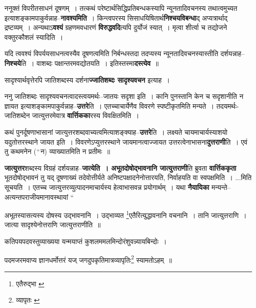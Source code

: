 \documentclass[article,12pt,a4paper]{memoir}
\newcommand{\add}[1]{($^{+}$#1)}
\begin{document}
	  \endgroup
	

	  \pstart ननूक्तं विपरीतसाधनं दूषणम् । तत्कथं परेष्टार्थसिद्धिप्रतिबन्धकस्यापि न्यूनतादिवचनस्य तथात्वमुच्यत इत्याशङ्कामपाकुर्वन्नाह--\textbf{नावश्यमिति} । किन्त्वपरस्य सिसाधयिषितार्थ\textbf{निश्चयविबन्धा}द् अप्यत्रार्थाद् द्रष्टव्यम् । अन्यथाऽ\textbf{वश्यं} ग्रहणमवधारणं \textbf{विरुद्धवदि}त्यपि दुर्योजं स्यात् । मृत्वा शीर्त्वा च तद्योजने वक्तुरकौशलं स्यादिति ।
	\pend
      

	  \pstart यदि त्ववश्यं विपर्ययसाधनत्वस्यैव दूषणत्वमिति निर्बन्धस्तदा तदप्यस्य न्यूनतादिवचनस्यास्तीति दर्शयन्नाह--\textbf{निश्चये}ति । वाशब्दः पक्षान्तरमवद्योतयति । इतिस्तस्मा\textbf{दस्त्येव} ॥
	\pend
      

	  \pstart सादृश्यार्थवृत्तेरपि जातिशब्दस्य दर्शना\textbf{ज्जातिशब्दः सादृश्यवचन} इत्याह ।
	\pend
      

	  \pstart ननु जातिशब्दः सादृश्यवचनत्वादस्त्वयमर्थः--जातयः सदृशा इति । कानि पुनस्तानि केन च सदृशानीति न ज्ञायत इत्याशङ्कामपाकुर्वन्नाह--\textbf{उत्तरे}ति । एतच्चाचार्येणैव विवरणे स्पष्टीकृतमिति मन्यते । तदयमर्थः-जातिशब्देन जात्युत्तरमेवात्र \textbf{वार्त्तिकका}रस्य विवक्षितमिति ।
	\pend
      

	  \pstart कथं पुनर्दूषणाभासानां जात्युत्तरशब्दवाच्यत्वमित्याशङ्क्याह--\textbf{उत्तरे}ति । लक्ष्यते चायमाचार्यस्याशयो यदुतोत्तरस्थाने जायत इति । विवरणेऽप्युत्तरस्थाने जायमानत्वाज्जायत उत्तरत्वेनाभासना\textbf{दुत्तराणी}ति । एवं तु कथमनेन \add{न} व्याख्यातमिति न प्रतीमः ॥
	\pend
      

	  \pstart \textbf{जात्युत्तर}शब्दस्य विग्रहं दर्शयन्नाह--\textbf{जात्येति । अभूतदोषोद्भावनानि जात्युत्तराणी}ति ब्रुवता \textbf{वार्त्तिककृता} भूतदोषोद्भावनं तु यद् दूषणाख्यं तदेवोत्तीर्यते अनिष्टपक्षादनेनोत्तारयति, निर्वाहयति वा स्वपक्षमिति । \leavevmode{}...मिति सूचयति । एतच्च जात्युत्तरव्युत्पादनमाचार्यस्य हेत्वाभासवन्न प्रयोगार्थम् । यथा \textbf{नैयायिका} मन्यन्ते--अत्यन्तपराजीयमानावस्थायां     \leavevmode{} “
	  
	अभूतस्यासत्यस्य दोषस्य उद्भावनानि । उद्भाव्यत \footnote{एतैरुद्भा \cite{dp-msC}}\-एतैरित्युद्धावनानि वचनानि । तानि जात्युत्तराणि । जात्या सादृश्येनोत्तराणि जात्युत्तराणीति ॥ 
	  
	कतिपयपदवस्तुव्याख्यया यन्मयाप्तं कुशलममलमिन्दोरंशुवन्न्यायबिन्दोः । 
	  
	पदमजरमवाप्य ज्ञानधर्मोत्तरं यज् जगदुपकृतिमात्रव्यापृतिः\footnote{व्यापृतः \cite{dp-msC} \cite{dp-msD}} स्यामतोऽहम् ॥ 
	  
\end{document}
